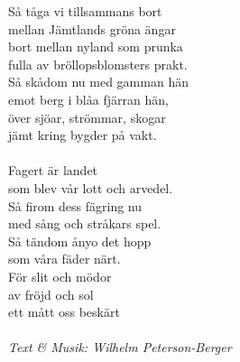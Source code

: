 \vspace{10pt}
Så tåga vi tillsammans bort\\
mellan Jämtlands gröna ängar\\
bort mellan nyland som prunka\\
fulla av bröllopsblomsters prakt.\\
Så skådom nu med gamman hän\\
emot berg i blåa fjärran hän,\\
över sjöar, strömmar, skogar\\
jämt kring bygder på vakt.\\
\\
\revrpt Fagert är landet\\
som blev vår lott och arvedel.\\
Så firom dess fägring nu\\
med sång och stråkars spel.\\
Så tändom ånyo det hopp\\
som våra fäder närt.\\
För slit och mödor\\
av fröjd och sol\\
ett mått oss beskärt\rpt\\
\\
{\footnotesize\textit{Text \& Musik: Wilhelm Peterson-Berger}}
